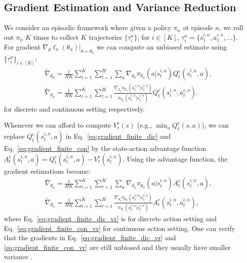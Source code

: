 \documentclass{article}
\begin{document}
\subsection{Gradient Estimation and Variance Reduction}
We consider an episodic framework where given a policy $\pi_n$ at episode $n$, we roll out $\pi_n$ $K$ times to collect $K$ trajectories $\{\tau_i^{n}\}$, for $i\in [K]$, $\tau_i^n=\{s_1^{i,n},a_1^{i,n},...\}$.  For gradient $\nabla_{\theta}\ell_n(\theta_n)|_{\theta=\theta_n}$ %
we can compute an unbiased estimate using $\{\tau_i^n\}_{i\in[K]}$:
\begin{align}
\label{eq:gradient_finite_dic}
&\tilde{\nabla}_{\theta_n} = \frac{1}{HK}\sum_{i=1}^K\sum_{t=1}^H\sum_{a}\nabla_{\theta_n}\pi_{\theta_n}(a|s^{i,n}_t) Q_t^e(s^{i,n}_t, a), \\
&\label{eq:gradient_finite_con}
\tilde{\nabla}_{\theta_n} = \frac{1}{HK}\sum_{i=1}^K\sum_{t=1}^H \frac{\nabla_{\theta_n}\pi_{\theta_n}(a^{i,n}_t|s_t^{i,n})}{\pi_{\theta_n}(a_t^{i,n}|s_t^{i,n})}Q_t^e(s_t^{i,n},a_t^{i,n}).
\end{align} for discrete and  continuous setting respectively. %

Whenever we can afford to compute $V_t^e(s)$ (e.g., $\min_a Q_t^e(s,a)$), we can replace $Q_t^e(s_t^{i,n},a)$ in Eq.~\ref{eq:gradient_finite_dic} and Eq.~\ref{eq:gradient_finite_con} by the state-action advantage function $A^e_t(s_t^{i,n},a) = Q^e_t(s_t^{i,n},a) - V_t^e(s_t^{i,n})$. Using the advantage function, the gradient estimations become:
\begin{align}
&\tilde{\nabla}_{\theta_n} = \frac{1}{HK}\sum_{i=1}^K\sum_{t=1}^H\sum_{a}\nabla_{\theta_n}\pi_{\theta_n}(a|s^{i,n}_t) A_t^e(s^{i,n}_t, a), \label{eq:gradient_finite_dic_vr}\\
&\tilde{\nabla}_{\theta_n} = \frac{1}{HK}\sum_{i=1}^K\sum_{t=1}^H \frac{\nabla_{\theta_n}\pi_{\theta_n}(a^{i,n}_t|s_t^{i,n})}{\pi_{\theta_n}(a_t^{i,n}|s_t^{i,n})}A_t^e(s_t^{i,n},a_t^{i,n}),
\label{eq:gradient_finite_con_vr}
\end{align} where Eq.~\ref{eq:gradient_finite_dic_vr} is for discrete action setting and Eq.~\ref{eq:gradient_finite_con_vr} for continuous action setting. One can verify that the gradients in Eq.~\ref{eq:gradient_finite_dic_vr} and \ref{eq:gradient_finite_con_vr} are still unbiased and they usually have smaller variance \cite{greensmith2004variance}.
\end{document}
